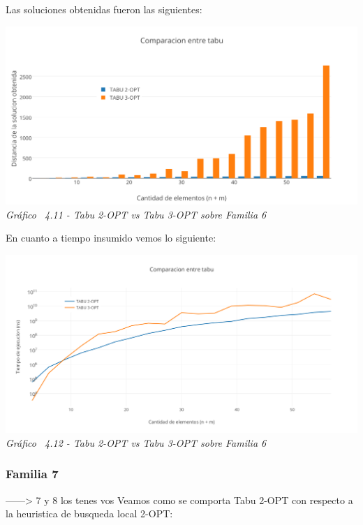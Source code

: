 Las soluciones obtenidas fueron las siguientes:

\vspace*{0.3cm} \vspace*{0.3cm}
  \begin{center}
 \includegraphics[scale=0.5]{./EJ4/comparativosinorden.png}\\
 {            \textit{Gráfico \ 4.11 - Tabu 2-OPT vs Tabu 3-OPT sobre Familia 6}}
  \end{center}
  \vspace*{0.3cm}

En cuanto a tiempo insumido vemos lo siguiente:

\vspace*{0.3cm} \vspace*{0.3cm}
  \begin{center}
 \includegraphics[scale=0.5]{./EJ4/comparacionsinorden1.png}\\
 {            \textit{Gráfico \ 4.12 - Tabu 2-OPT vs Tabu 3-OPT sobre Familia 6}}
  \end{center}
  \vspace*{0.3cm}




\subsubsection*{Familia 7}
------> 7 y 8 los tenes vos
Veamos como se comporta Tabu 2-OPT con respecto a la heuristica de busqueda local 2-OPT:

